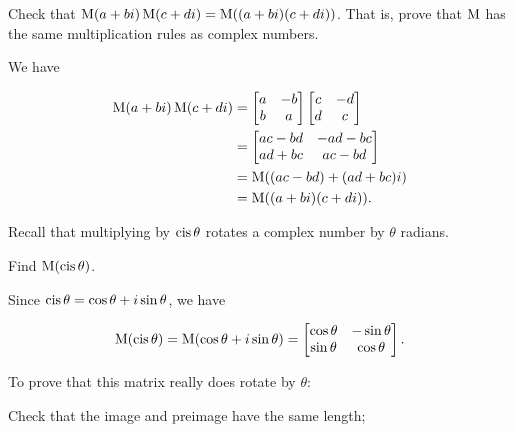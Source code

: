 \documentclass[../key.tex]{subfiles}
\begin{document}
\begin{outer_problem}
\item Check that $\operatorname{M} (a+bi)\operatorname{M} (c+di)=\operatorname{M}((a+bi)(c+di))$. That is, prove that $\operatorname{M}$ has the same multiplication rules as complex numbers.
\end{outer_problem}

We have

\begin{align*}
\operatorname{M} (a+bi)\operatorname{M} (c+di) &= \begin{bmatrix} a & -b \\ b & a \end{bmatrix} \begin{bmatrix} c & -d \\ d & c \end{bmatrix} \\
&= \begin{bmatrix} ac-bd & -ad-bc \\ ad+bc & ac-bd \end{bmatrix} \\
&= \operatorname{M}((ac-bd) + (ad+bc)i) \\
&= \operatorname{M}((a+bi)(c+di)).
\end{align*}

\begin{outer_problem}
\item Recall that multiplying by $\operatorname{cis}\theta$ rotates a complex number by $\theta$ radians.
\end{outer_problem}

\begin{inner_problem}[start=1]
\item Find $\operatorname{M} (\operatorname{cis}\theta)$.
\end{inner_problem}

Since $\operatorname{cis}\theta = \cos\theta + i\sin\theta$, we have

$$\operatorname{M}(\operatorname{cis}\theta) = \operatorname{M}(\cos\theta + i\sin\theta) = \begin{bmatrix} \cos\theta & -\sin\theta \\ \sin\theta & \cos\theta \end{bmatrix}.$$

\begin{inner_problem}
\item To prove that this matrix really does rotate by $\theta$:
\end{inner_problem}

\begin{iinner_problem}[start=1]
\item Check that the image and preimage have the same length;
\end{iinner_problem}
\end{document}
